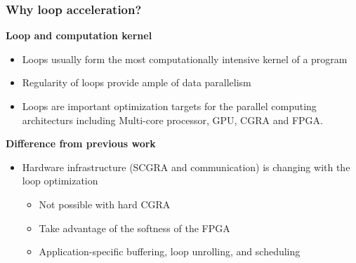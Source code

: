 \documentclass{beamer}
\begin{document}
\begin{frame}[t]
\frametitle{Why loop acceleration?}

\vspace{-1em}
\textbf{Loop and computation kernel}
\begin{itemize}
\item Loops usually form the most computationally intensive kernel of a program
\item Regularity of loops provide ample of data parallelism
\item Loops are important optimization targets for the parallel computing architecturs including
Multi-core processor, GPU, CGRA and FPGA.
\end{itemize}

\textbf{Difference from previous work}
\begin{itemize}
\item Hardware infrastructure (SCGRA and communication) is changing with the loop optimization
\begin{itemize}
\item[\checkmark] Not possible with hard CGRA
\item[\checkmark] Take advantage of the softness of the FPGA
\item[\checkmark] Application-specific buffering, loop unrolling, and scheduling
\end{itemize}
\end{itemize}

\end{frame}

\end{document}
